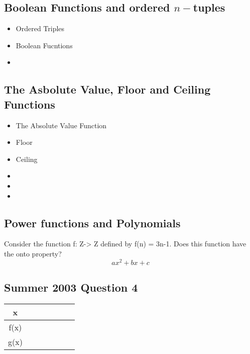 \documentclass{article}
\begin{document}
\newpage
\subsection{Boolean Functions and ordered $n-$tuples}


\begin{itemize}
\item Ordered Triples
\item Boolean Fucntions
\item
\end{itemize}

\subsection*{The Asbolute Value, Floor and Ceiling Functions}
\begin{itemize}
\item The Absolute Value Function
\item Floor
\item Ceiling
\end{itemize}



\begin{itemize}
\item
\item
\item
\end{itemize}

\subsection*{Power functions and Polynomials}


Consider the function f: Z-> Z defined by f(n) = 3n-1. Does this function have the onto property?
\[ax^2 + bx + c\]
\subsection*{Summer 2003 Question 4}

\begin{tabular}{ccccccc}
 x & & & & & & \\ \hline
 f(x) & & & & & & \\ \hline
 g(x) & & & & & & \\ \hline
\end{tabular}

\end{document}

